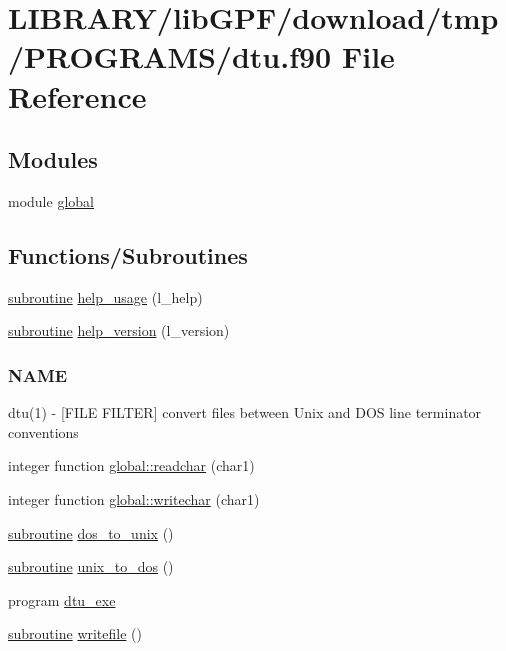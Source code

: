\hypertarget{dtu_8f90}{}\section{L\+I\+B\+R\+A\+R\+Y/lib\+G\+P\+F/download/tmp/\+P\+R\+O\+G\+R\+A\+M\+S/dtu.f90 File Reference}
\label{dtu_8f90}
\subsection*{Modules}
\begin{DoxyCompactItemize}
\item 
module \hyperlink{namespaceglobal}{global}
\end{DoxyCompactItemize}
\subsection*{Functions/\+Subroutines}
\begin{DoxyCompactItemize}
\item 
\hyperlink{M__stopwatch_83_8txt_acfbcff50169d691ff02d4a123ed70482}{subroutine} \hyperlink{dtu_8f90_a3e09a3b52ee8fb04eeb93fe5761626a8}{help\+\_\+usage} (l\+\_\+help)
\item 
\hyperlink{M__stopwatch_83_8txt_acfbcff50169d691ff02d4a123ed70482}{subroutine} \hyperlink{dtu_8f90_a39c21619b08a3c22f19e2306efd7f766}{help\+\_\+version} (l\+\_\+version)
\begin{DoxyCompactList}\small\item\em \subsubsection*{N\+A\+ME}

dtu(1) -\/ \mbox{[}F\+I\+LE F\+I\+L\+T\+ER\mbox{]} convert files between Unix and D\+OS line terminator conventions \end{DoxyCompactList}\item 
integer function \hyperlink{namespaceglobal_ac0b651e598e238c7eacf10df65cd92b2}{global\+::readchar} (char1)
\item 
integer function \hyperlink{namespaceglobal_aa4c95f5c7250975b756bcd2131c3b88c}{global\+::writechar} (char1)
\item 
\hyperlink{M__stopwatch_83_8txt_acfbcff50169d691ff02d4a123ed70482}{subroutine} \hyperlink{dtu_8f90_a2106e8eae75b8f66312eadae9a00d01f}{dos\+\_\+to\+\_\+unix} ()
\item 
\hyperlink{M__stopwatch_83_8txt_acfbcff50169d691ff02d4a123ed70482}{subroutine} \hyperlink{dtu_8f90_aaa5cd93a63e974bc45e4a6e2d6537ded}{unix\+\_\+to\+\_\+dos} ()
\item 
program \hyperlink{dtu_8f90_abff0f15f5d5e680978944e8d3530395a}{dtu\+\_\+exe}
\item 
\hyperlink{M__stopwatch_83_8txt_acfbcff50169d691ff02d4a123ed70482}{subroutine} \hyperlink{dtu_8f90_a6431a93cf13a3651f17078298d2d2ef9}{writefile} ()
\end{DoxyCompactItemize}
